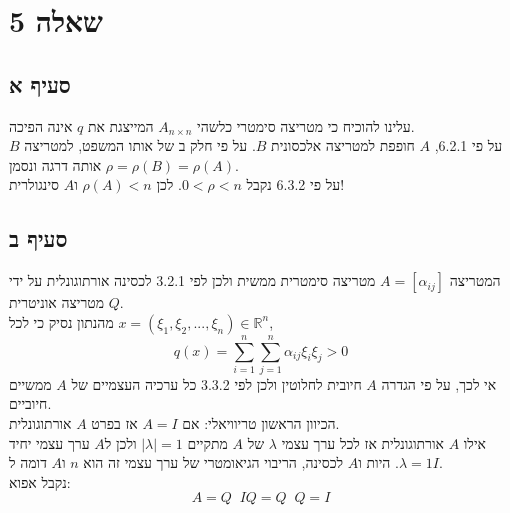 \documentclass{article}
\def\reals{\mathbb{R}}
\DeclareMathOperator{\adj}{^\ast}
\DeclareMathOperator{\inv}{^{-1}}
\begin{document}
\pagebreak

\section*{שאלה 5}

\subsection*{סעיף א}

עלינו להוכיח כי מטריצה סימטרי כלשהי $A_{n\times n}$ המייצגת את $q$ אינה הפיכה. \\
על פי 6.2.1, $A$ חופפת למטריצה אלכסונית $B$. על פי חלק ב של אותו המשפט, למטריצה $B$ אותה דרגה ונסמן $\rho=\rho(B)=\rho(A)$. \\
על פי 6.3.2 נקבל $0<\rho<n$. לכן $\rho(A)<n$ ו$A$ סינגולרית!

\subsection*{סעיף ב}

המטריצה $A=[\alpha_{ij}]$ מטריצה סימטרית ממשית ולכן לפי 3.2.1 לכסינה אורתוגונלית על ידי מטריצה אוניטרית $Q$. \\
מהנתון נסיק כי לכל $x=(\xi_1, \xi_2, ..., \xi_n)\in \reals^n$,
\[
    q(x)=\sum_{i=1}^{n}\sum_{j=1}^{n} \alpha_{ij}\xi_i\xi_j>0
\]
אי לכך, על פי הגדרה $A$ חיובית לחלוטין ולכן לפי 3.3.2 כל ערכיה העצמיים של $A$ ממשיים חיוביים. \\
הכיוון הראשון טריוויאלי: אם $A=I$ אז בפרט $A$ אורתוגונלית. \\
אילו $A$ אורתוגונלית אז לכל ערך עצמי $\lambda$ של $A$ מתקיים $|\lambda|=1$ ולכן ל$A$ ערך עצמי יחיד $\lambda=1$.
היות ו$A$ לכסינה, הריבוי הגיאומטרי של ערך עצמי זה הוא $n$ ו$A$ דומה ל$I$. \\
נקבל אפוא:
\[
    A=Q\adj I Q = Q \inv Q = I
\]
\end{document}
